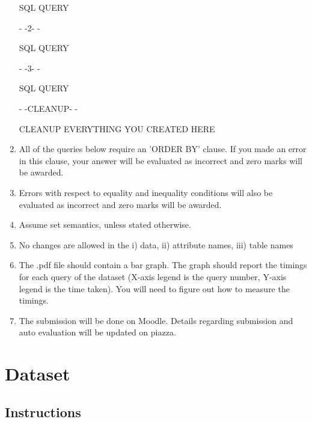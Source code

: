 \documentclass[10pt]{article}
\begin{document}
\begin{enumerate}
SQL QUERY

- -2- -

SQL QUERY

- -3- -

SQL QUERY

- -CLEANUP- -

CLEANUP EVERYTHING YOU CREATED HERE

\item All of the queries below require an 'ORDER BY' clause. If you made an error in this clause, your answer will be evaluated as incorrect and zero marks will be awarded. 

\item Errors with respect to equality and inequality conditions will also be evaluated as incorrect and zero marks will be awarded. 

\item Assume set semantics, unless stated otherwise.

\item No changes are allowed in the i) data, ii) attribute names, iii) table names

\item The .pdf file should contain a bar graph. The graph should report the timings for each query of the dataset (X-axis legend is the query number, Y-axis legend is the time taken). You will need to figure out how to measure the timings.

\item The submission will be done on Moodle. Details regarding submission and auto evaluation will be updated on piazza.
\end{enumerate}

\section{Dataset}

\subsection{Instructions}
\end{document}
